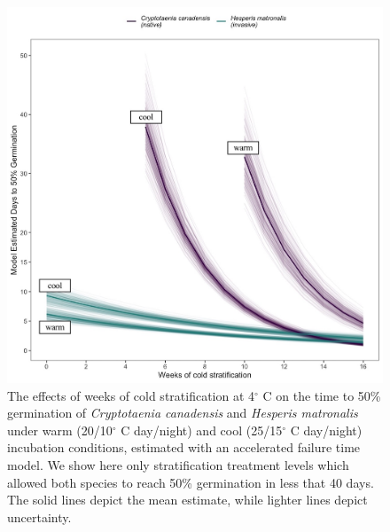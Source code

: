 \documentclass{article}[11pt]
\begin{document}
\begin{figure}[h!]
    \centering
          \includegraphics[width=\textwidth]{..//figure/AFTsivansive.jpeg}
   
\caption{The effects of weeks of cold stratification at 4$^{\circ}$ C on the time to 50\% germination of \textit {Cryptotaenia canadensis} and \textit{Hesperis matronalis} under warm (20/10$^{\circ}$ C day/night) and cool (25/15$^{\circ}$ C day/night) incubation conditions, estimated with an accelerated failure time model. We show here only stratification treatment levels which allowed both species to reach 50\% germination in less that 40 days. The solid lines depict the mean estimate, while lighter lines depict uncertainty.} %
    \label{fig:aft}
\end{figure}
\end{document}
